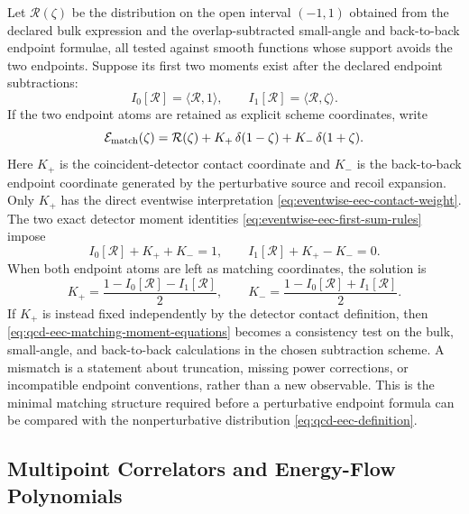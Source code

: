 Let \(\mathcal R(\zeta)\) be the distribution on the open interval
\((-1,1)\) obtained from the declared bulk expression and the
overlap-subtracted small-angle and back-to-back endpoint formulae, all tested
against smooth functions whose support avoids the two endpoints.  Suppose its
first two moments exist after the declared endpoint subtractions:
\begin{equation}
  I_0[\mathcal R]=\langle \mathcal R,1\rangle,
  \qquad
  I_1[\mathcal R]=\langle \mathcal R,\zeta\rangle .
  \label{eq:qcd-eec-open-interval-moments}
\end{equation}
If the two endpoint atoms are retained as explicit scheme coordinates, write
\begin{equation}
  \mathcal E_{\rm match}(\zeta)
  =
  \mathcal R(\zeta)
  +K_+\,\delta(1-\zeta)
  +K_-\,\delta(1+\zeta).
  \label{eq:qcd-eec-matched-distribution-contact-terms}
\end{equation}
Here \(K_+\) is the coincident-detector contact coordinate and \(K_-\) is the
back-to-back endpoint coordinate generated by the perturbative source and
recoil expansion.  Only \(K_+\) has the direct eventwise interpretation
\eqref{eq:eventwise-eec-contact-weight}.  The two exact detector moment
identities \eqref{eq:eventwise-eec-first-sum-rules} impose
\begin{equation}
  I_0[\mathcal R]+K_+ +K_-=1,
  \qquad
  I_1[\mathcal R]+K_+ -K_-=0.
  \label{eq:qcd-eec-matching-moment-equations}
\end{equation}
When both endpoint atoms are left as matching coordinates, the solution is
\begin{equation}
  K_+
  =
  \frac{1-I_0[\mathcal R]-I_1[\mathcal R]}{2},
  \qquad
  K_-
  =
  \frac{1-I_0[\mathcal R]+I_1[\mathcal R]}{2}.
  \label{eq:qcd-eec-matching-delta-solution}
\end{equation}
If \(K_+\) is instead fixed independently by the detector contact definition,
then \eqref{eq:qcd-eec-matching-moment-equations} becomes a consistency test
on the bulk, small-angle, and back-to-back calculations in the chosen
subtraction scheme.  A mismatch is a statement about truncation, missing
power corrections, or incompatible endpoint conventions, rather than a new
observable.  This is the minimal matching structure required before a
perturbative endpoint formula can be compared with the nonperturbative
distribution \eqref{eq:qcd-eec-definition}.

\subsection{Multipoint Correlators and Energy-Flow Polynomials}

